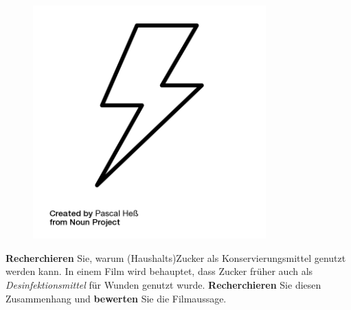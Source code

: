 \documentclass{scrartcl}  %
\begin{document}
\begin{tcolorbox}
			\end{tcolorbox}
		
\vspace{0.3cm}			
			\begin{tcolorbox}[enhanced,
				colback=white,
				colframe=red,
				fonttitle=\sffamily\bfseries\large, 
				title=Für schnelle Schüler\_innen,  %
				attach boxed title to top left={xshift=3.2mm,yshift=-0.40mm},
				boxed title style={skin=enhancedfirst jigsaw,size=small,arc=1mm,bottom=-1mm,colframe=red,height=0.75cm},
				colbacktitle=red,
				drop lifted shadow]
				\begin{figure}  
					\centering
					\vspace{-14pt}  %
					\includegraphics[width=0.8\textwidth]{symbols/symbol_tex_faststudents}
				\end{figure}
				
				\textbf{Recherchieren} Sie, warum (Haushalts)Zucker als Konservierungsmittel genutzt werden kann.
				\newline
				In einem Film wird behauptet, dass Zucker früher auch als \textit{Desinfektionsmittel} für Wunden genutzt wurde. \textbf{Recherchieren} Sie diesen Zusammenhang und \textbf{bewerten} Sie die Filmaussage.
				
			\end{tcolorbox}

\newpage
\end{document}
